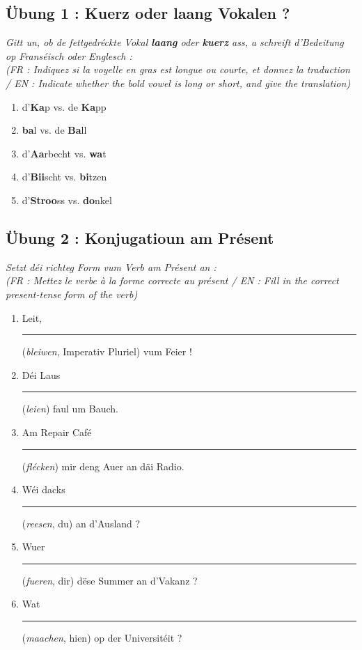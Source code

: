 \subsection*{Übung 1 : Kuerz oder laang Vokalen ?}
\textit{Gitt un, ob de fettgedréckte Vokal \textbf{laang} oder \textbf{kuerz} ass, a schreift d'Bedeitung op Franséisch oder Englesch :} \\
\textit{\small(FR : Indiquez si la voyelle en gras est longue ou courte, et donnez la traduction / EN : Indicate whether the bold vowel is long or short, and give the translation)}
\begin{enumerate}
    \item d'\textbf{Ka}p vs. de \textbf{Ka}pp
    \item \textbf{ba}l vs. de \textbf{Ba}ll
    \item d'\textbf{Aa}rbecht vs. \textbf{wa}t
    \item d'\textbf{Bii}scht vs. \textbf{bi}tzen
    \item d'\textbf{Stroo}ss vs. \textbf{do}nkel
\end{enumerate}

\subsection*{Übung 2 : Konjugatioun am Présent}
\textit{Setzt déi richteg Form vum Verb am Présent an :} \\
\textit{\small(FR : Mettez le verbe à la forme correcte au présent / EN : Fill in the correct present-tense form of the verb)}
\begin{enumerate}
    \item Leit, \rule{2cm}{0.4pt} (\textit{bleiwen}, Imperativ Pluriel) vum Feier !
    \item Déi Laus \rule{2cm}{0.4pt} (\textit{leien}) faul um Bauch.
    \item Am Repair Café \rule{2cm}{0.4pt} (\textit{flécken}) mir deng Auer an däi Radio.
    \item Wéi dacks \rule{2cm}{0.4pt} (\textit{reesen}, du) an d'Ausland ?
    \item Wuer \rule{2cm}{0.4pt} (\textit{fueren}, dir) dëse Summer an d'Vakanz ?
    \item Wat \rule{2cm}{0.4pt} (\textit{maachen}, hien) op der Universitéit ?
\end{enumerate}

